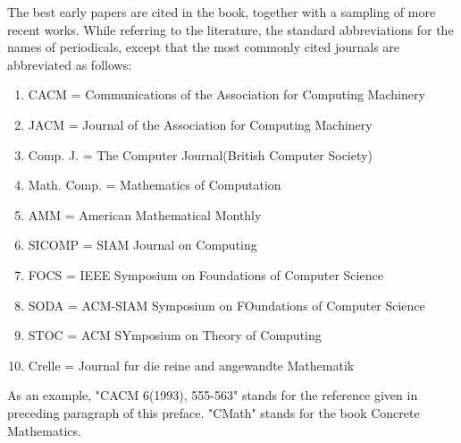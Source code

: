 \documentclass{article}
\begin{document}
The best early papers are cited in the book, together with a sampling of more recent works. While referring to the literature, the standard abbreviations for the names of periodicals, except that the most commonly cited journals are abbreviated as follows:
\begin{enumerate}
    \item[] CACM = Communications of the Association for Computing Machinery 
    \item[] JACM = Journal of the Association for Computing Machinery 
    \item[] Comp. J. = The Computer Journal(British Computer Society)
    \item[] Math. Comp. = Mathematics of Computation 
    \item[] AMM = American Mathematical Monthly 
    \item[] SICOMP = SIAM Journal on Computing
    \item[] FOCS = IEEE Symposium on Foundations of Computer Science
    \item[] SODA = ACM-SIAM Symposium on FOundations of Computer Science
    \item[] STOC = ACM SYmposium on Theory of Computing
    \item[] Crelle =  Journal fur die reine and angewandte Mathematik
\end{enumerate}

As an example, "CACM 6(1993), 555-563" stands for the reference given in preceding paragraph of this preface. "CMath" stands for the book Concrete Mathematics.
\end{document}
